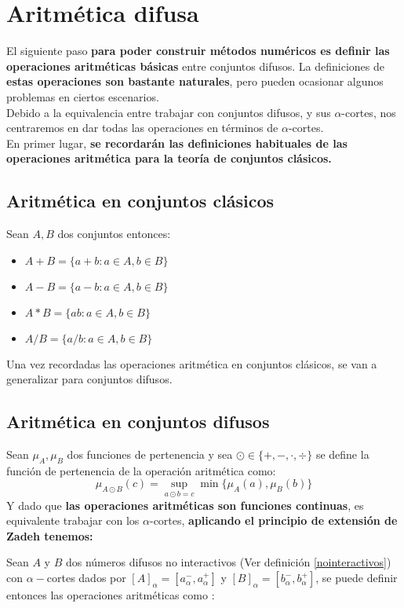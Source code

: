   \section{Aritmética difusa}
  El siguiente paso \textbf{para poder construir métodos numéricos es definir las operaciones aritméticas básicas} entre conjuntos difusos. La definiciones de \textbf{estas operaciones son bastante naturales}, pero pueden ocasionar algunos problemas en ciertos escenarios.\\
  Debido a la equivalencia entre trabajar con conjuntos difusos, y sus $\alpha$-cortes, nos centraremos en dar todas las operaciones en términos de $\alpha$-cortes.\\
  En primer lugar, \textbf{se recordarán las definiciones habituales de las operaciones aritmética para la teoría de conjuntos clásicos.}

  \subsection{Aritmética en conjuntos clásicos}
  Sean $A, B$ dos conjuntos entonces:
  \begin{itemize}
  \item $A+B=\{a+b : a \in A, b\in B\}$
  \item $A - B =\{a - b : a \in A, b\in B\}$
  \item $A * B =\{ab : a \in A, b\in B\}$
  \item $A / B =\{a/b : a \in A, b\in B\}$
  \end{itemize}

  Una vez recordadas las operaciones aritmética en conjuntos clásicos, se van a generalizar para conjuntos difusos.

  \subsection{Aritmética en conjuntos difusos}
  Sean $\mu_A, \mu_B$ dos funciones de pertenencia y sea $\odot \in \{+, -, \cdot, \div\}$ se define la función de pertenencia de la operación aritmética como:
  $$
  \mu_{A \odot B}(c) = \sup_{a \odot b = c} \min\{\mu_A(a), \mu_B(b)\}
  $$
  Y dado que \textbf{las operaciones aritméticas son funciones continuas}, es equivalente trabajar con los $\alpha$-cortes, \textbf{aplicando el principio de extensión de Zadeh tenemos:}

  Sean $A$ y $B$ dos números difusos no interactivos (Ver definición \ref{nointeractivos}) con $\alpha-$cortes dados por $[A]_\alpha=[a_\alpha^-, a_\alpha^+]$ y $[B]_\alpha=[b_\alpha^-, b_\alpha^+]$, se puede definir entonces las operaciones aritméticas como \cite{fuzzyintro}:

